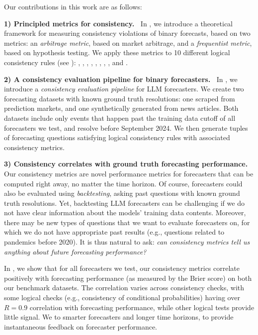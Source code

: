 Our contributions in this work are as follows:

\textbf{1) Principled metrics for consistency.~}
In , we introduce a theoretical framework for measuring consistency violations of binary forecasts, based on two metrics: an \emph{arbitrage metric}, based on market arbitrage, and a \emph{frequentist metric}, based on hypothesis testing. We apply these metrics to 10 different logical consistency rules (see ):
\NegChecker{}, \ParaphraseChecker{},  \ConsequenceChecker{}, \AndOrChecker{}, \AndChecker{}, \OrChecker{}, \ButChecker{}, \CondChecker{}, \CondCondChecker{} and \ExpectedEvidenceChecker{}.

\textbf{2) A consistency evaluation pipeline for binary forecasters.~}
In , we introduce a \emph{consistency evaluation pipeline} for LLM forecasters.
We create two forecasting datasets with known ground truth resolutions: one scraped from prediction markets, and one synthetically generated from news articles.
Both datasets include only events that happen past the training data cutoff of all forecasters we test, and resolve before September 2024.
We then generate tuples of forecasting questions satisfying logical consistency rules with associated consistency metrics.

\textbf{3) Consistency correlates with ground truth forecasting performance.}
Our consistency metrics are novel performance metrics for forecasters that can be computed right away, no matter the time horizon.
Of course, forecasters could also be evaluated using \emph{backtesting}, asking past questions with known ground truth resolutions.
Yet, backtesting LLM forecasters can be challenging if we do not have clear information about the models' training data contents. Moreover, there may be new types of questions that we want to evaluate forecasters on, for which we do not have appropriate past results (e.g., questions related to pandemics before 2020).
It is thus natural to ask:
\emph{can consistency metrics tell us anything about future forecasting performance?}

In , we show that for all forecasters we test, our consistency metrics correlate positively with forecasting performance (as measured by the Brier score) on both our benchmark datasets.
The correlation varies across consistency checks, with some logical checks (e.g., consistency of conditional probabilities) having over $R=0.9$ correlation with forecasting performance, while other logical tests provide little signal.
We  to smarter forecasters and longer time horizons, to provide instantaneous feedback on forecaster performance.

